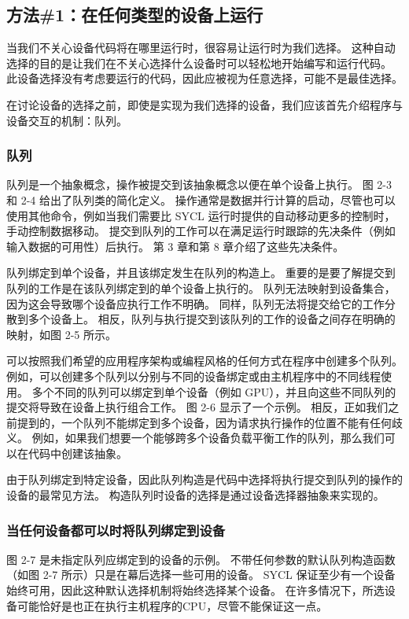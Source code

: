 \subsection{方法\#1：在任何类型的设备上运行}
当我们不关心设备代码将在哪里运行时，很容易让运行时为我们选择。 这种自动选择的目的是让我们在不关心选择什么设备时可以轻松地开始编写和运行代码。 此设备选择没有考虑要运行的代码，因此应被视为任意选择，可能不是最佳选择。

在讨论设备的选择之前，即使是实现为我们选择的设备，我们应该首先介绍程序与设备交互的机制：队列。

\subsubsection{队列}
队列是一个抽象概念，操作被提交到该抽象概念以便在单个设备上执行。 图 2-3 和 2-4 给出了队列类的简化定义。 操作通常是数据并行计算的启动，尽管也可以使用其他命令，例如当我们需要比 SYCL 运行时提供的自动移动更多的控制时，手动控制数据移动。 提交到队列的工作可以在满足运行时跟踪的先决条件（例如输入数据的可用性）后执行。 第 3 章和第 8 章介绍了这些先决条件。

队列绑定到单个设备，并且该绑定发生在队列的构造上。 重要的是要了解提交到队列的工作是在该队列绑定到的单个设备上执行的。 队列无法映射到设备集合，因为这会导致哪个设备应执行工作不明确。 同样，队列无法将提交给它的工作分散到多个设备上。 相反，队列与执行提交到该队列的工作的设备之间存在明确的映射，如图 2-5 所示。

可以按照我们希望的应用程序架构或编程风格的任何方式在程序中创建多个队列。 例如，可以创建多个队列以分别与不同的设备绑定或由主机程序中的不同线程使用。 多个不同的队列可以绑定到单个设备（例如 GPU），并且向这些不同队列的提交将导致在设备上执行组合工作。 图 2-6 显示了一个示例。 相反，正如我们之前提到的，一个队列不能绑定到多个设备，因为请求执行操作的位置不能有任何歧义。 例如，如果我们想要一个能够跨多个设备负载平衡工作的队列，那么我们可以在代码中创建该抽象。

由于队列绑定到特定设备，因此队列构造是代码中选择将执行提交到队列的操作的设备的最常见方法。 构造队列时设备的选择是通过设备选择器抽象来实现的。

\subsubsection{当任何设备都可以时将队列绑定到设备}
图 2-7 是未指定队列应绑定到的设备的示例。 不带任何参数的默认队列构造函数（如图 2-7 所示）只是在幕后选择一些可用的设备。 SYCL 保证至少有一个设备始终可用，因此这种默认选择机制将始终选择某个设备。 在许多情况下，所选设备可能恰好是也正在执行主机程序的CPU，尽管不能保证这一点。

